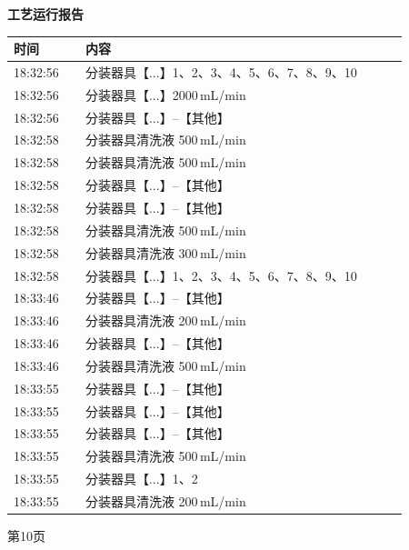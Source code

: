 \documentclass[UTF8,10pt,a4paper,fontset=fandol]{ctexart}
\begin{document}
\hfill
\begin{minipage}[t]{0.47\linewidth}
\centering
\textbf{工艺运行报告}

\vspace{2pt}
\scriptsize
\begin{tabular}{|p{0.16\linewidth}|p{0.72\linewidth}|}
\hline
时间 & 内容 \\ \hline
18:32:56 & 分装器具【...】1、2、3、4、5、6、7、8、9、10 \\ \hline
18:32:56 & 分装器具【...】2000\,mL/min \\ \hline
18:32:56 & 分装器具【...】--【其他】 \\ \hline
18:32:58 & 分装器具清洗液 500\,mL/min \\ \hline
18:32:58 & 分装器具清洗液 500\,mL/min \\ \hline
18:32:58 & 分装器具【...】--【其他】 \\ \hline
18:32:58 & 分装器具【...】--【其他】 \\ \hline
18:32:58 & 分装器具清洗液 500\,mL/min \\ \hline
18:32:58 & 分装器具清洗液 300\,mL/min \\ \hline
18:32:58 & 分装器具【...】1、2、3、4、5、6、7、8、9、10 \\ \hline
18:33:46 & 分装器具【...】--【其他】 \\ \hline
18:33:46 & 分装器具清洗液 200\,mL/min \\ \hline
18:33:46 & 分装器具【...】--【其他】 \\ \hline
18:33:46 & 分装器具清洗液 500\,mL/min \\ \hline
18:33:55 & 分装器具【...】--【其他】 \\ \hline
18:33:55 & 分装器具【...】--【其他】 \\ \hline
18:33:55 & 分装器具【...】--【其他】 \\ \hline
18:33:55 & 分装器具清洗液 500\,mL/min \\ \hline
18:33:55 & 分装器具【...】1、2 \\ \hline
18:33:55 & 分装器具清洗液 200\,mL/min \\ \hline
\end{tabular}

\vspace{2pt}
\tiny 第10页
\end{minipage}

\vspace{12pt}
\end{document}
